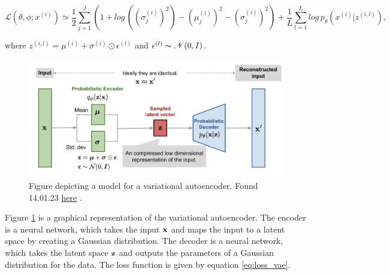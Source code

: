 \begin{equation}\label{eq:loss_vae}
    \mathcal{L}(\theta, \phi;x^{(i)}) \simeq \frac{1}{2}\sum_{j=1}^{J}(1 + log\, ((\sigma^{(i)}_{j})^2) - (\mu^{(i)}_{j})^2 - (\sigma^{(i)}_{j})^2) +\frac{1}{L}\sum_{l=1}^{L}log\, p_{\theta}(x^{(i)}|z^{(i,l)}),
\end{equation}

where $z^{(i,l)} = \mu^{(i)} + \sigma^{(i)} \odot \epsilon^{(l)}$ and $ \epsilon^{(l)} \thicksim \mathcal{N}(0,I)$. 




\begin{figure}[h!]
    \includegraphics[width=\linewidth]{Figures/Machinelearning/vae-gaussian.png}
    \caption{Figure depicting a model for a variational autoencoder. Found 14.01.23 \href{https://lilianweng.github.io/posts/2018-08-12-vae/vae-gaussian.png}{here} \cite{weng2018VAE}. }
    \label{fig:vae}
\end{figure}

Figure \ref{fig:vae} is a graphical representation of the variational autoencoder. The encoder is a neural network, which takes 
the input $\bf{x}$ and maps the input to a latent space by creating a Gaussian distribution. The decoder is a neural network, 
which takes the latent space $\bf{z}$ and outputs the parameters of a Gaussian distribution for the data.
The loss function is given by equation \ref{eq:loss_vae}.